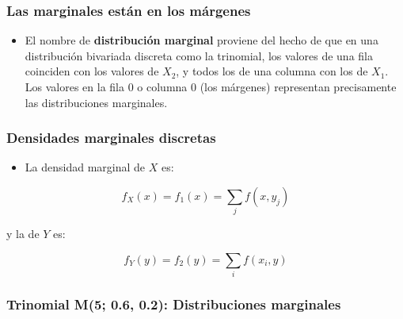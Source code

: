 \documentclass[
]{article}
\providecommand{\tightlist}{%
  \setlength{\itemsep}{0pt}\setlength{\parskip}{0pt}}
\begin{document}
\subsubsection{Las marginales están en los márgenes}\label{las-marginales-estuxe1n-en-los-muxe1rgenes}

\begin{itemize}
\tightlist
\item
  El nombre de \textbf{distribución marginal} proviene del hecho de que en una distribución bivariada discreta como la trinomial, los valores de una fila coinciden con los valores de \(X_2\), y todos los de una columna con los de \(X_1\). Los valores en la fila 0 o columna 0 (los márgenes) representan precisamente las distribuciones marginales.
\end{itemize}

\subsubsection{Densidades marginales discretas}\label{densidades-marginales-discretas}

\begin{itemize}
\tightlist
\item
  La densidad marginal de \(X\) es:
\end{itemize}

\[
f_X(x) = f_1(x) = \sum_j f(x, y_j)
\]

y la de \(Y\) es:

\[
f_Y(y) = f_2(y) = \sum_i f(x_i, y)
\]

\subsubsection{Trinomial M(5; 0.6, 0.2): Distribuciones marginales}\label{trinomial-m5-0.6-0.2-distribuciones-marginales}
\end{document}

